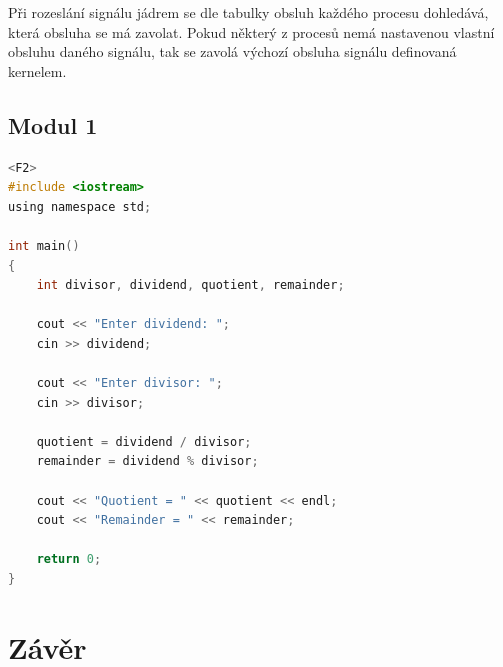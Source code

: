 \documentclass[12pt, a4paper]{article}
\let\oldsection\section
\renewcommand\section{\clearpage\oldsection}
\begin{document}
Při rozeslání signálu jádrem se dle tabulky obsluh každého procesu dohledává, která obsluha se má zavolat. Pokud některý z procesů nemá nastavenou vlastní obsluhu daného signálu, tak se zavolá výchozí obsluha signálu definovaná kernelem.


    \subsection{Modul 1}
    	    \begin{lstlisting}[language=C, caption={Lorem ipsum dolor sit amet},captionpos=b]<F2>
#include <iostream>
using namespace std;

int main()
{    
    int divisor, dividend, quotient, remainder;

    cout << "Enter dividend: ";
    cin >> dividend;

    cout << "Enter divisor: ";
    cin >> divisor;

    quotient = dividend / divisor;
    remainder = dividend % divisor;

    cout << "Quotient = " << quotient << endl;
    cout << "Remainder = " << remainder;

    return 0;
}\end{lstlisting}


\section{Závěr}	
\end{document}
